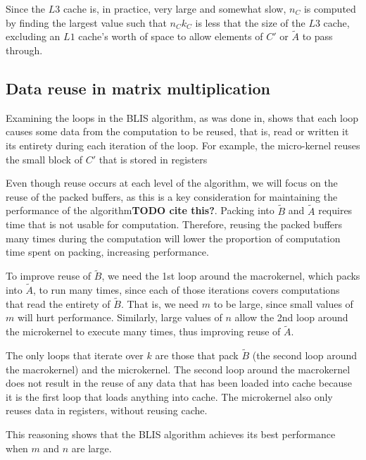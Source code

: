\documentclass[12pt]{article}
\begin{document}
Since the $L3$ cache is, in practice, very large and somewhat slow, $n_C$ is computed by finding the largest value such that $n_Ck_C$ is less that the size of the $L3$ cache, excluding an $L1$ cache's worth of space to allow elements of $C'$ or $\tilde{A}$ to pass through.

\subsection{Data reuse in  matrix multiplication}
Examining the loops in the BLIS algorithm, as was done in\cite{Low2016}, shows that each loop causes some data from the computation to be reused, that is, read or written it its entirety during each iteration of the loop.
For example, the micro-kernel reuses the small block of $C'$ that is stored in registers

Even though reuse occurs at each level of the algorithm, we will focus on the reuse of the packed buffers, as this is a key consideration for maintaining the performance of the algorithm\textbf{TODO cite this?}.
Packing into $\tilde{B}$ and $\tilde{A}$ requires time that is not usable for computation.
Therefore, reusing the packed buffers many times during the computation will lower the proportion of computation time spent on packing, increasing performance.

To improve reuse of $\tilde{B}$, we need the 1st loop around the macrokernel, which packs into $\tilde{A}$, to run many times, since each of those iterations covers computations that read the entirety of $\tilde{B}$.
That is, we need $m$ to be large, since small values of $m$ will hurt performance.
Similarly, large values of $n$ allow the 2nd loop around the microkernel to execute many times, thus improving reuse of $\tilde{A}$.

The only loops that iterate over $k$ are those that pack $\tilde{B}$ (the second loop around the macrokernel) and the microkernel.
The second loop around the macrokernel does not result in the reuse of any data that has been loaded into cache because it is the first loop that loads anything into cache.
The microkernel also only reuses data in registers, without reusing cache.

This reasoning shows that the BLIS algorithm achieves its best performance when $m$ and $n$ are large.
\end{document}
